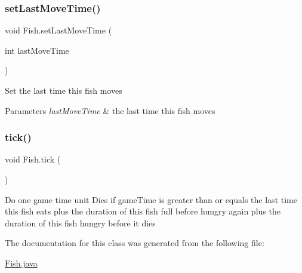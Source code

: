 \subsubsection{\texorpdfstring{set\+Last\+Move\+Time()}{setLastMoveTime()}}
{\footnotesize\ttfamily void Fish.\+set\+Last\+Move\+Time (\begin{DoxyParamCaption}\item[{int}]{last\+Move\+Time }\end{DoxyParamCaption})\hspace{0.3cm}{\ttfamily [inline]}}

Set the last time this fish moves 
\begin{DoxyParams}{Parameters}
{\em last\+Move\+Time} & the last time this fish moves \\
\hline
\end{DoxyParams}
\mbox{\label{class_fish_aefe1a78dd5e5bf6a4f152c948d701a09}} 
\subsubsection{\texorpdfstring{tick()}{tick()}}
{\footnotesize\ttfamily void Fish.\+tick (\begin{DoxyParamCaption}{ }\end{DoxyParamCaption})\hspace{0.3cm}{\ttfamily [inline]}}

Do one game time unit Dies if game\+Time is greater than or equals the last time this fish eats plus the duration of this fish full before hungry again plus the duration of this fish hungry before it dies 

The documentation for this class was generated from the following file\+:\begin{DoxyCompactItemize}
\item 
\mbox{\hyperlink{_fish_8java}{Fish.\+java}}\end{DoxyCompactItemize}
